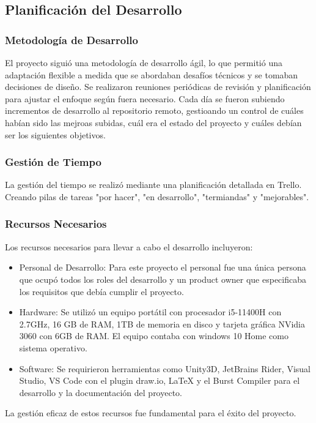 \subsection{Planificación del Desarrollo}

\subsubsection{Metodología de Desarrollo}
El proyecto siguió una metodología de desarrollo ágil, lo que permitió una adaptación flexible a medida que se abordaban desafíos técnicos y se tomaban decisiones de diseño. Se realizaron reuniones periódicas de revisión y planificación para ajustar el enfoque según fuera necesario. Cada día se fueron subiendo incrementos de desarrollo al repositorio remoto, gestioando un control de cuáles habían sido las mejroas subidas, cuál era el estado del proyecto y cuáles debían ser los siguientes objetivos.

\subsubsection{Gestión de Tiempo}
La gestión del tiempo se realizó mediante una planificación detallada en Trello. Creando pilas de tareas "por hacer", "en desarrollo", "termiandas" y "mejorables".

\subsubsection{Recursos Necesarios}
Los recursos necesarios para llevar a cabo el desarrollo incluyeron:

\begin{itemize}
    \item Personal de Desarrollo: Para este proyecto el personal fue una única persona que ocupó todos los roles del desarrollo y un product owner que especificaba los requisitos que debía cumplir el proyecto.
    
    \item Hardware: Se utilizó un equipo portátil con procesador i5-11400H con 2.7GHz, 16 GB de RAM, 1TB de memoria en disco y tarjeta gráfica NVidia 3060 con 6GB de RAM. El equipo contaba con windows 10 Home como sistema operativo. 
    
    \item Software: Se requirieron herramientas como Unity3D, JetBrains Rider, Visual Studio, VS Code con el plugin draw.io, LaTeX y el Burst Compiler para el desarrollo y la documentación del proyecto.
\end{itemize}

La gestión eficaz de estos recursos fue fundamental para el éxito del proyecto.
